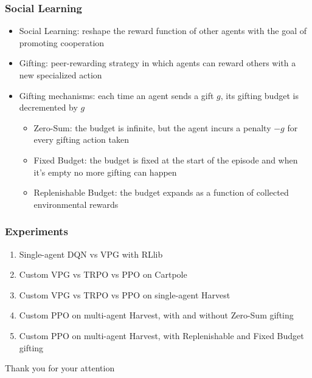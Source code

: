\documentclass{beamer}
\begin{document}
\begin{frame}
	\frametitle{Social Learning}
	\begin{itemize}
		\item Social Learning: reshape the reward function of other agents with the goal of promoting cooperation
		\item Gifting: peer-rewarding strategy in which agents can reward others with a new specialized action
		\item Gifting mechanisms: each time an agent sends a gift $g$, its gifting budget is decremented by $g$
		\begin{itemize}
			\item Zero-Sum: the budget is infinite, but the agent incurs a penalty $-g$ for every gifting action taken
			\item Fixed Budget: the budget is fixed at the start of the episode and when it's empty no more gifting can happen
			\item Replenishable Budget: the budget expands as a function of collected environmental rewards
		\end{itemize}
	\end{itemize}
\end{frame}

\begin{frame}
	\frametitle{Experiments}
	\begin{enumerate}
		\item Single-agent DQN vs VPG with RLlib
		\item Custom VPG vs TRPO vs PPO on Cartpole
		\item Custom VPG vs TRPO vs PPO on single-agent Harvest
		\item Custom PPO on multi-agent Harvest, with and without Zero-Sum gifting
		\item Custom PPO on multi-agent Harvest, with Replenishable and Fixed Budget gifting
	\end{enumerate}
\end{frame}



\appendix

\begin{frame}[standout]
	Thank you for your attention
\end{frame}
\end{document}
